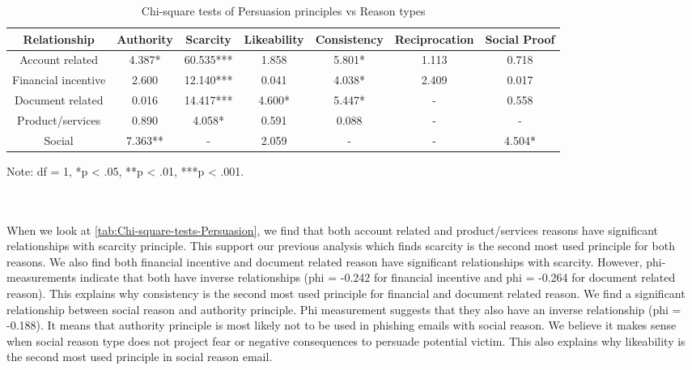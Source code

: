 \begin{minipage}[t]{1\columnwidth}%
\begin{longtable}{ccccccc}
\caption{{\scriptsize{}\label{tab:Chi-square-tests-Persuasion}Chi-square tests
of Persuasion principles vs Reason types}}
\tabularnewline
\toprule 
{\scriptsize{}Relationship} & {\scriptsize{}Authority} & {\scriptsize{}Scarcity} & {\scriptsize{}Likeability} & {\scriptsize{}Consistency} & {\scriptsize{}Reciprocation} & {\scriptsize{}Social Proof}\tabularnewline
\midrule
\midrule 
{\scriptsize{}Account related} & {\scriptsize{}4.387{*}} & {\scriptsize{}60.535{*}{*}{*}} & {\scriptsize{}1.858} & {\scriptsize{}5.801{*}} & {\scriptsize{}1.113} & {\scriptsize{}0.718}\tabularnewline
\midrule 
{\scriptsize{}Financial incentive} & {\scriptsize{}2.600} & {\scriptsize{}12.140{*}{*}{*}} & {\scriptsize{}0.041} & {\scriptsize{}4.038{*}} & {\scriptsize{}2.409} & {\scriptsize{}0.017}\tabularnewline
\midrule 
{\scriptsize{}Document related} & {\scriptsize{}0.016} & {\scriptsize{}14.417{*}{*}{*}} & {\scriptsize{}4.600{*}} & {\scriptsize{}5.447{*}} & - & {\scriptsize{}0.558}\tabularnewline
\midrule 
{\scriptsize{}Product/services} & {\scriptsize{}0.890} & {\scriptsize{}4.058{*}} & {\scriptsize{}0.591} & {\scriptsize{}0.088} & - & -\tabularnewline
\midrule 
{\scriptsize{}Social } & {\scriptsize{}7.363{*}{*}} & - & {\scriptsize{}2.059} & - & - & {\scriptsize{}4.504{*}}\tabularnewline
\midrule
\end{longtable}

Note: df = 1, {*}p < .05, {*}{*}p < .01, {*}{*}{*}p < .001.%
\end{minipage}\\
\ \\
When we look at \autoref{tab:Chi-square-tests-Persuasion}, we find
that both account related and product/services reasons have significant
relationships with scarcity principle. This support our previous analysis
which finds scarcity is the second most used principle for both reasons.
We also find both financial incentive and document related reason
have significant relationships with scarcity. However, phi-measurements
indicate that both have inverse relationships (phi = -0.242 for financial
incentive and phi = -0.264 for document related reason). This explains
why consistency is the second most used principle for financial and
document related reason. We find a significant relationship between
social reason and authority principle. Phi measurement suggests that
they also have an inverse relationship (phi = -0.188). It means that
authority principle is most likely not to be used in phishing emails
with social reason. We believe it makes sense when social reason type
does not project fear or negative consequences to persuade potential
victim. This also explains why likeability is the second most used
principle in social reason email.


